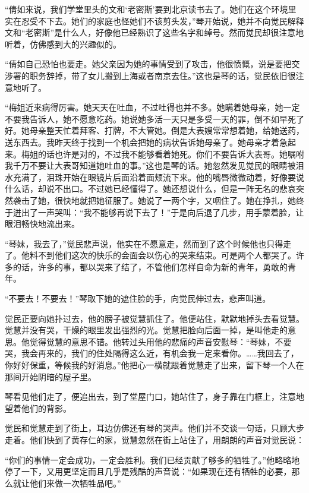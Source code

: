 \par “倩如来说，我们学堂里头的文和‘老密斯’要到北京读书去了。她们在这个环境里实在忍受不下去。她们的家庭也怪她们不该剪头发，”琴开始说，她并不向觉民解释文和“老密斯”是什么人，好像他已经熟识了这些名字和绰号。然而觉民却很注意地听着，仿佛感到大的兴趣似的。
\par “倩如自己恐怕也要走。她父亲因为她的事情受到了攻击，他很愤慨，说是要把交涉署的职务辞掉，带了女儿搬到上海或者南京去住。”这也是琴的话，觉民依旧很注意地听了。
\par “梅姐近来病得厉害。她天天在吐血，不过吐得也并不多。她瞒着她母亲，她一定不要我告诉人，她不愿意吃药。她说她多活一天只是多受一天的罪，倒不如早死了好。她母亲整天忙着拜客、打牌，不大管她。倒是大表嫂常常想着她，给她送药，送东西去。我昨天终于找到一个机会把她的病状告诉她母亲了。她母亲才着急起来。梅姐的话也许是对的，不过我不能够看着她死。你们不要告诉大表哥。她嘱咐我千万不要让大表哥知道她吐血的事。”这也是琴的话。她忽然发见觉民的眼睛被泪水充满了，泪珠开始在眼镜片后面沿着面颊流下来。他的嘴唇微微动着，好像要说什么话，却说不出口。不过她已经懂得了。她还想说什么，但是一阵无名的悲哀突然袭击了她，很快地就把她征服了。她说了一两个字，又咽住了。她在挣扎，她终于迸出了一声哭叫：“我不能够再说下去了！”于是向后退了几步，用手蒙着脸，让眼泪畅快地流出来。
\par “琴妹，我去了，”觉民悲声说，他实在不愿意走，然而到了这个时候他也只得走了。他料不到他们这次的快乐的会面会以伤心的哭来结束。可是两个人都哭了。许多的话，许多的事，都以哭来了结了，不管他们怎样自命为新的青年，勇敢的青年。
\par “不要去！不要去！”琴取下她的遮住脸的手，向觉民伸过去，悲声叫道。
\par 觉民正要向她扑过去，他的膀子被觉慧抓住了。他便站住，默默地掉头去看觉慧。觉慧并没有哭，干燥的眼里发出强烈的光。觉慧把脸向后面一掉，是叫他走的意思。他觉得觉慧的意思不错。他转过头用他的悲痛的声音安慰琴：“琴妹，不要哭，我会再来的，我们的住处隔得这么近，有机会我一定来看你。……我回去了，你好好保重，等候我的好消息。”他把心一横就跟着觉慧走了出来，留下琴一个人在那间开始阴暗的屋子里。
\par 琴看见他们走了，便追出去，到了堂屋门口，她站住了，身子靠在门框上，注意地望着他们的背影。
\par 觉民和觉慧走到了街上，耳边仿佛还有琴的哭声。他们并不交谈一句话，只顾大步走着。他们快到了黄存仁的家，觉慧忽然在街上站住了，用朗朗的声音对觉民说：
\par “你们的事情一定会成功，一定会胜利。我们已经贡献了够多的牺牲了。”他略略地停了一下，又用更坚定而且几乎是残酷的声音说：“如果现在还有牺牲的必要，那么就让他们来做一次牺牲品吧。”


